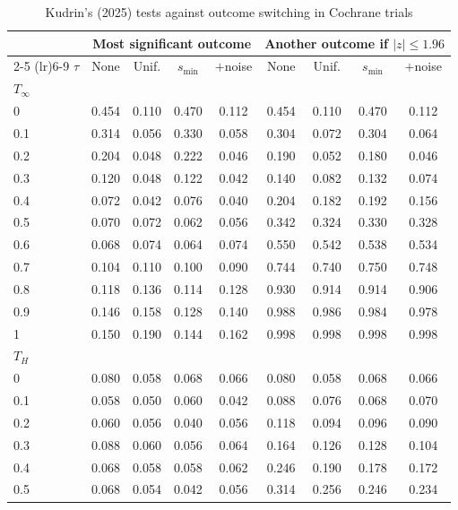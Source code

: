 \begin{table}[htbp]
\centering
\caption{Kudrin's (2025) tests against outcome switching in Cochrane trials}
\label{tab:cochrane_switching_power_desktop_kudrin}
\footnotesize
\setlength{\tabcolsep}{4pt}
\begin{tabular}{lcccccccc}
\toprule
 & \multicolumn{4}{c}{Most significant outcome} & \multicolumn{4}{c}{Another outcome if $|z| \le 1.96$} \\
\cmidrule(lr){2-5} \cmidrule(lr){6-9}
$\tau$ & None & Unif. & $s_{\min}$ & $+$noise & None & Unif. & $s_{\min}$ & $+$noise \\
\midrule
\multicolumn{9}{l}{\textit{$T_\infty$}} \\
0 & 0.454 & 0.110 & 0.470 & 0.112 & 0.454 & 0.110 & 0.470 & 0.112 \\
0.1 & 0.314 & 0.056 & 0.330 & 0.058 & 0.304 & 0.072 & 0.304 & 0.064 \\
0.2 & 0.204 & 0.048 & 0.222 & 0.046 & 0.190 & 0.052 & 0.180 & 0.046 \\
0.3 & 0.120 & 0.048 & 0.122 & 0.042 & 0.140 & 0.082 & 0.132 & 0.074 \\
0.4 & 0.072 & 0.042 & 0.076 & 0.040 & 0.204 & 0.182 & 0.192 & 0.156 \\
0.5 & 0.070 & 0.072 & 0.062 & 0.056 & 0.342 & 0.324 & 0.330 & 0.328 \\
0.6 & 0.068 & 0.074 & 0.064 & 0.074 & 0.550 & 0.542 & 0.538 & 0.534 \\
0.7 & 0.104 & 0.110 & 0.100 & 0.090 & 0.744 & 0.740 & 0.750 & 0.748 \\
0.8 & 0.118 & 0.136 & 0.114 & 0.128 & 0.930 & 0.914 & 0.914 & 0.906 \\
0.9 & 0.146 & 0.158 & 0.128 & 0.140 & 0.988 & 0.986 & 0.984 & 0.978 \\
1 & 0.150 & 0.190 & 0.144 & 0.162 & 0.998 & 0.998 & 0.998 & 0.998 \\
\midrule
\multicolumn{9}{l}{\textit{$T_H$}} \\
0 & 0.080 & 0.058 & 0.068 & 0.066 & 0.080 & 0.058 & 0.068 & 0.066 \\
0.1 & 0.058 & 0.050 & 0.060 & 0.042 & 0.088 & 0.076 & 0.068 & 0.070 \\
0.2 & 0.060 & 0.056 & 0.040 & 0.056 & 0.118 & 0.094 & 0.096 & 0.090 \\
0.3 & 0.088 & 0.060 & 0.056 & 0.064 & 0.164 & 0.126 & 0.128 & 0.104 \\
0.4 & 0.068 & 0.058 & 0.058 & 0.062 & 0.246 & 0.190 & 0.178 & 0.172 \\
0.5 & 0.068 & 0.054 & 0.042 & 0.056 & 0.314 & 0.256 & 0.246 & 0.234 \\

\end{tabular}
\end{table}
